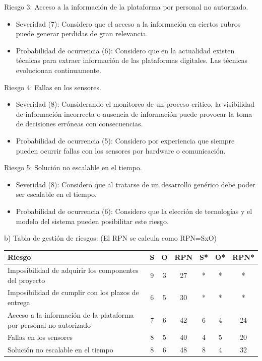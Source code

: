 \documentclass[
11pt, %
]{charter}
\begin{document}
Riesgo 3: Acceso a la información de la plataforma por personal no autorizado.
\begin{itemize}
	\item Severidad (7): Considero que el acceso a la información en ciertos rubros puede generar perdidas de gran relevancia.
	\item Probabilidad de ocurrencia (6): Considero que en la actualidad existen técnicas para extraer información de las plataformas digitales. Las técnicas evolucionan continuamente.\\
\end{itemize}


Riesgo 4: Fallas en los sensores.
\begin{itemize}
	\item Severidad (8): Considerando el monitoreo de un proceso critico, la visibilidad de información incorrecta o ausencia de información puede provocar la toma de decisiones erróneas con consecuencias. 
	\item Probabilidad de ocurrencia (5): Considero por experiencia que siempre pueden ocurrir fallas con los sensores por hardware o comunicación. 
\end{itemize}


Riesgo 5: Solución no escalable en el tiempo.
\begin{itemize}
	\item Severidad (8): Considero que al tratarse de un desarrollo genérico debe poder ser escalable en el tiempo.
	\item Probabilidad de ocurrencia (6): Considero que la elección de tecnologías y el modelo del sistema pueden posibilitar este riesgo.
\end{itemize}


b) Tabla de gestión de riesgos:      (El RPN se calcula como RPN=SxO)

\begin{table}[htpb]
\centering
\begin{tabularx}{\linewidth}{@{}|X|c|c|c|c|c|c|@{}}
\hline
\rowcolor[HTML]{C0C0C0} 
Riesgo & S & O & RPN & S* & O* & RPN* \\ \hline
Imposibilidad de adquirir los componentes del proyecto       &9   &3   &27     &*    &*    &*      \\ \hline
Imposibilidad de cumplir con los plazos de entrega       &6   &5   &30     &*    &*    &*      \\ \hline
Acceso a la información de la plataforma por personal no autorizado       &7   &6   &42     &6    &4    &24      \\ \hline
Fallas en los sensores       &8   &5   &40     &4    &5    &20      \\ \hline
Solución no escalable en el tiempo       &8  &6   &48     &8    &4    &32      \\ \hline
\end{tabularx}%
\end{table}
\end{document}
